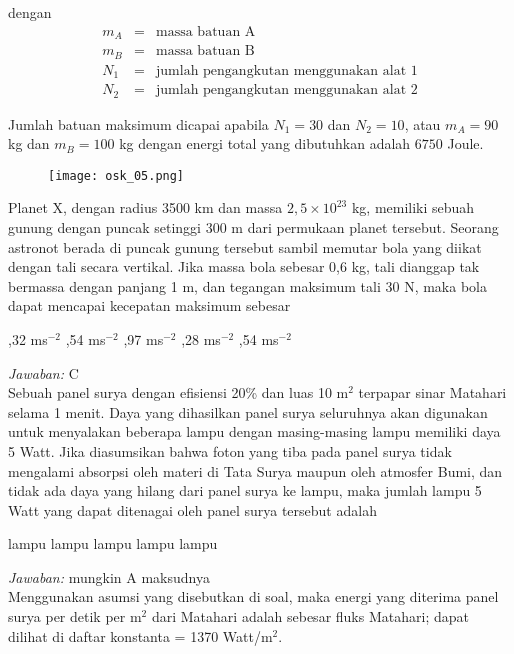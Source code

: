 \documentclass[11pt,fleqn]{exam}
\begin{document}
\begin{questions}
dengan
\begin{eqnarray*}
m_A &=& \text{massa batuan A}\\
m_B &=& \text{massa batuan B}\\
N_1 &=& \text{jumlah pengangkutan menggunakan alat 1}\\
N_2 &=& \text{jumlah pengangkutan menggunakan alat 2}
\end{eqnarray*}

Jumlah batuan maksimum dicapai apabila $N_1 = 30$ dan $N_2 = 10$, atau $m_A = 90$ kg dan $m_B = 100$ kg dengan energi total yang dibutuhkan adalah $6750$ Joule.

\begin{figure}[!ht]
\centering
\texttt{[image: osk\_05.png]}
\end{figure}

\question Planet X, dengan radius 3500 km dan massa $2,5 \times 10^{23}$ kg, memiliki sebuah gunung dengan puncak setinggi 300 m dari permukaan planet tersebut. Seorang astronot berada di puncak gunung tersebut sambil memutar bola yang diikat dengan tali secara vertikal. Jika massa bola sebesar 0,6 kg, tali dianggap tak bermassa dengan panjang 1 m, dan tegangan maksimum tali 30 N, maka bola dapat mencapai kecepatan maksimum sebesar
\begin{choices}
,32 ms$^{-2}$
,54 ms$^{-2}$
,97 ms$^{-2}$
,28 ms$^{-2}$
,54 ms$^{-2}$
\end{choices}

\textit{Jawaban: } C\\


\question Sebuah panel surya dengan efisiensi 20\% dan luas 10 m$^2$ terpapar sinar Matahari selama 1 menit. Daya yang dihasilkan panel surya seluruhnya akan digunakan untuk menyalakan beberapa lampu dengan masing-masing lampu memiliki daya 5 Watt. Jika diasumsikan bahwa foton yang tiba pada panel surya tidak mengalami absorpsi oleh materi di Tata Surya maupun oleh atmosfer Bumi, dan tidak ada daya yang hilang dari panel surya ke lampu, maka jumlah lampu 5 Watt yang dapat ditenagai oleh panel surya tersebut adalah
\begin{choices}
 lampu
 lampu
 lampu
 lampu
 lampu
\end{choices}

\textit{Jawaban: } mungkin A maksudnya\\

Menggunakan asumsi yang disebutkan di soal, maka energi yang diterima panel surya per detik per m$^2$ dari Matahari adalah sebesar fluks Matahari; dapat dilihat di daftar konstanta = 1370 Watt/m$^2$. 


\end{questions}
\end{document}
